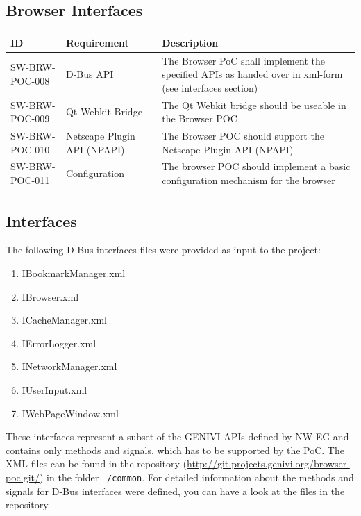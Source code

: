 \documentclass{pelagicore}
\begin{document}
\subsection{Browser Interfaces}
\begin{tabularx}{\textwidth}{|p{4em} | p{6.5em} | X |}
    \hline
    \rowcolor{blue}
    \bf ID & \bf Requirement & \bf Description \\
    \hline
    SW-BRW-POC-008 & D-Bus API & The Browser PoC shall implement the specified
                                 APIs as handed over in xml-form (see
                                 interfaces section)\\
    \hline
    SW-BRW-POC-009 & Qt Webkit Bridge & The Qt Webkit bridge should be useable
                                        in the Browser POC \\
    \hline
    SW-BRW-POC-010 & Netscape Plugin API (NPAPI) &
        The Browser POC should support the Netscape Plugin API (NPAPI) \\
    \hline
    SW-BRW-POC-011 & Configuration & The browser POC should implement a basic
                                     configuration mechanism for the browser\\
    \hline
\end{tabularx}

\subsection{Interfaces}
The following D-Bus interfaces files were provided as input to the project:

\begin{enumerate}
    \item IBookmarkManager.xml
    \item IBrowser.xml
    \item ICacheManager.xml
    \item IErrorLogger.xml
    \item INetworkManager.xml
    \item IUserInput.xml
    \item IWebPageWindow.xml
\end{enumerate}

These interfaces represent a subset of the GENIVI APIs defined by NW-EG and
contains only methods and signals, which has to be supported by the PoC. The
XML files can be found in the repository
(\url{http://git.projects.genivi.org/browser-poc.git/}) in the folder {\tt
/common}. For detailed information about the methods and signals for D-Bus
interfaces were defined, you can have a look at the files in the repository.
\end{document}
